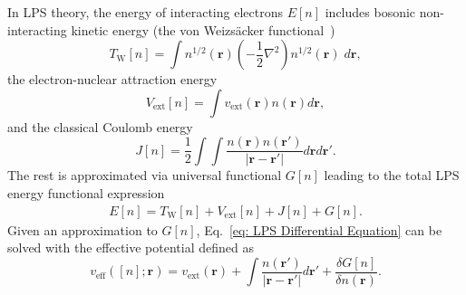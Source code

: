 \documentclass[%
 reprint,
 amsmath,amssymb,
 aps,
pra,
]{revtex4-2}
\begin{document}
In LPS theory, the energy of interacting electrons $E[n]$ includes bosonic non-interacting kinetic energy (the von Weizsäcker functional~\cite{Weizsäcker.1935.ZP.96.431}) 
\begin{equation}
    T_{\text{W}}[n]
    =
    \int 
    n^{1/2}(\textbf{r})
    \left(
    -\frac{1}{2}
    \nabla^2
    \right)
    n^{1/2}(\textbf{r})
    \;d\textbf{r},
\end{equation}
the electron-nuclear attraction energy 
\begin{equation}
    V_{\text{ext}}[n]
    =
    \int
    v_{\text{ext}}(\textbf{r})
    n(\textbf{r})
    d\textbf{r},
\end{equation}
and the classical Coulomb energy
\begin{equation}
    J[n]
    =
    \frac{1}{2}
    \int\int
    \frac{n(\textbf{r})n(\textbf{r}')}
    {|\textbf{r}-\textbf{r}'|}
    d\textbf{r}d\textbf{r}'.
\end{equation}
The rest is approximated via universal functional $G[n]$ leading to the total LPS energy functional expression
\begin{gather}
    E[n]
    =
    T_{\text{W}}[n]
    +
    V_{\text{ext}}[n] 
    +
    J[n]
    +
    G[n].\label{eq: LPS Energy}
\end{gather}
Given an approximation to $G[n]$, Eq.~\eqref{eq: LPS Differential Equation} can be solved with the effective potential defined as
\begin{equation}\label{eq: LPS Effective Potential}
    v_{\text{eff}}([n]; \textbf{r})
    =
    v_{\text{ext}}(\textbf{r})
    +
    \int\frac{n(\textbf{r}')}{|\textbf{r}-\textbf{r}'|}
    d\textbf{r}'
    +
    \frac{\delta G[n]}{\delta n(\textbf{r})}.
\end{equation}
 
\end{document}
